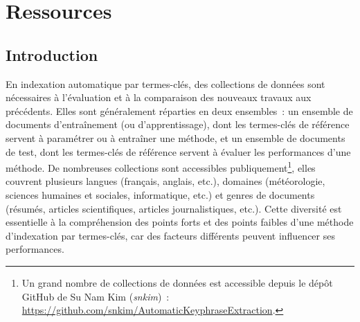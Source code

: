 \chapter{Ressources}
\label{chap:main-data_description}

  \section{Introduction}
  \label{sec:main-data_description-introduction}
    En indexation automatique par termes-clés, des
    collections de données sont nécessaires à l'évaluation et à la comparaison
    des nouveaux travaux aux précédents. Elles sont généralement réparties en
    deux ensembles~: un ensemble de documents d'entraînement (ou
    d'apprentissage), dont les termes-clés de référence servent à paramétrer ou
    à entraîner une méthode, et un ensemble de documents de test, dont les
    termes-clés de référence servent à évaluer les performances d'une méthode.
    De nombreuses collections sont accessibles publiquement\footnote{Un grand
    nombre de collections de données est accessible depuis le dépôt GitHub de Su
    Nam Kim (\textit{snkim})~:
    \url{https://github.com/snkim/AutomaticKeyphraseExtraction}.}, elles
    couvrent plusieurs langues (français, anglais, etc.), domaines
    (météorologie, sciences humaines et sociales, informatique, etc.) et genres
    de documents (résumés, articles scientifiques, articles journalistiques,
    etc.). Cette diversité est essentielle à la compréhension des points forts
    et des points faibles d'une méthode d'indexation par termes-clés, car des
    facteurs différents peuvent influencer ses performances.
